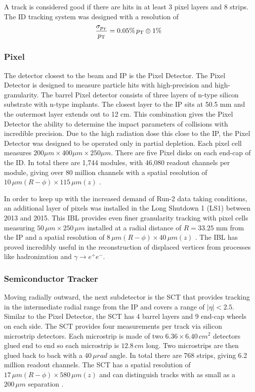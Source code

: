 		A track is considered good if there are hits in at least 3 pixel layers and 8 strips. The ID tracking system was designed with a resolution of 
		\begin{equation}\label{eqn:tracking-resolution}
		\frac{\sigma_{p_{\text{T}}}}{p_{\text{T}}} = 0.05 \% \, p_{\text{T}} \oplus 1\%
		\end{equation}
	
		\subsubsection{Pixel}\label{sssec:pixel}
			The detector closest to the beam and \gls{IP} is the Pixel Detector. The Pixel Detector is designed to measure particle hits with high-precision and high-granularity. The barrel Pixel detector consists of three layers of n-type silicon substrate with n-type implants. The closest layer to the \gls{IP} sits at 50.5 mm and the outermost layer extends out to 12 cm. This combination gives the Pixel Detector the ability to determine the impact parameters of collisions with incredible precision. Due to the high radiation dose this close to the \gls{IP}, the Pixel Detector was designed to be operated only in partial depletion. Each pixel cell measures $200 \mu m \times 400 \mu m \times 250 \mu m$. There are five Pixel disks on each end-cap of the \gls{ID}. In total there are 1,744 modules, with 46,080 readout channels per module, giving over 80 million channels with a spatial resolution of $10 \, \mu m (R-\phi) \times 115 \, \mu m (z)$ \cite{ATLAS-pixel}. 

			In order to keep up with the increased demand of Run-2 data taking conditions, an additional layer of pixels was installed in the Long Shutdown 1 (LS1) between 2013 and 2015. This \gls{IBL} provides even finer granularity tracking with pixel cells measuring $50 \, \mu m \times 250 \, \mu m$ installed at a radial distance of $R=33.25$ mm from the \gls{IP} and a spatial resolution of $8 \, \mu m (R-\phi) \times 40 \, \mu m (z)$ \cite{ATLAS-IBL}. The \gls{IBL} has proved incredibly useful in the reconstruction of displaced vertices from processes like \bjet hadronization and $\gamma \rightarrow e^+ e^-$.

		\subsubsection{Semiconductor Tracker}\label{sssec:SCT}
			Moving radially outward, the next subdetector is the \gls{SCT} that provides tracking in the intermediate radial range from the \gls{IP} and covers a range of $|\eta| < 2.5$. Similar to the Pixel Detector, the \gls{SCT} has 4 barrel layers and 9 end-cap wheels on each side. The \gls{SCT} provides four measurements per track via silicon microstrip detectors. Each microstrip is made of two $6.36 \times 6.40 \, cm^2$ detectors glued end to end so each microstrip is $12.8 \, cm$ long. Two microstrips are then glued back to back with a $40 \, \mu rad$ angle. In total there are 768 strips, giving 6.2 million readout channels. The \gls{SCT} has a spatial resolution of $17 \, \mu m (R-\phi) \times 580 \,\mu m (z)$ and can distinguish tracks with as small as a $200 \, \mu m$ separation \cite{ATLAS-ID}.

